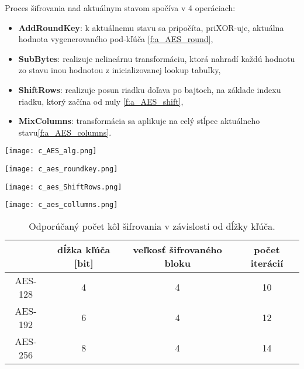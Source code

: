 \documentclass[12pt,a4wide,oneside,openright]{report}
\begin{document}
Proces šifrovania nad aktuálnym stavom spočíva v 4 operáciach:

\begin{itemize}
	\item \textbf{AddRoundKey}: k aktuálnemu stavu sa pripočíta, priXOR-uje, aktuálna hodnota vygenerovaného pod-kľúča \ref{f:a_AES_round},
	\item \textbf{SubBytes}: realizuje nelineárnu transformáciu, ktorá nahradí každú hodnotu zo stavu inou hodnotou z inicializovanej lookup tabuľky,
	\item \textbf{ShiftRows}: realizuje posun riadku doľava po bajtoch, na základe indexu riadku, ktorý začína od nuly \ref{f:a_AES_shift},
	\item \textbf{MixColumns}: transformácia sa aplikuje na celý stĺpec aktuálneho stavu\ref{f:a_AES_columns}.
\end{itemize}


\begin{figure*}[!htb]
	\centering
	\texttt{[image: c\_AES\_alg.png]}
	\caption{Algoritmus štandardu AES\cite{AESAnimation}.}
	\label{f:a_AES_animation}
\end{figure*}

\begin{figure*}[!htb]
	\centering
	\texttt{[image: c\_aes\_roundkey.png]}
	\caption{AddRoundKey\cite{AES}.}
	\label{f:a_AES_round}
\end{figure*}

\begin{figure*}[!htb]
	\centering
	\texttt{[image: c\_aes\_ShiftRows.png]}
	\caption{Operácia shift rows\cite{AES}.}
	\label{f:a_AES_shift}
\end{figure*}

\begin{figure*}[!htb]
	\centering
	\texttt{[image: c\_aes\_collumns.png]}
	\caption{MixColumns\cite{AES}.}
	\label{f:a_AES_columns}
\end{figure*}

\begin{table}
	\centering
	\caption{Odporúčaný počet kôl šifrovania v závislosti od dĺžky kľúča\cite{AES}.} 
	\label{table:AES_pocet_iteracii}
	\begin{tabular}{|c|c|c|c|}
		\hline
		 & \textbf{dĺžka kľúča} [bit] & \textbf{veľkosť šifrovaného bloku} & \textbf{počet iterácií} \\
		\hline
		AES-128 & 4 & 4 & 10\\
		\hline
		AES-192 & 6 & 4 & 12\\
		\hline
		AES-256 & 8 & 4 & 14\\
		\hline
	\end{tabular}
\end{table}
\end{document}
